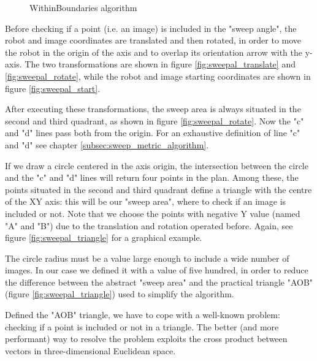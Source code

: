 \begin{figure}[htp]
\begin{center}
    \vspace*{20pt}

  \end{center}
  \caption{WithinBoundaries algorithm}
  \label{fig:withingboundaries}
\end{figure}

%
Before checking if a point (i.e. an image) is included in the "sweep angle", the robot and image coordinates
are translated and then rotated, in order to move the robot in the origin of the axis and to overlap its
orientation arrow with the y-axis. The two transformations are shown in figure \ref{fig:sweepal_translate} and
\ref{fig:sweepal_rotate}, while the robot and image starting coordinates are shown in figure \ref{fig:sweepal_start}.
%

%
After executing these transformations, the sweep area is always situated in the second and third quadrant, as
shown in figure \ref{fig:sweepal_rotate}. Now the "c" and "d" lines pass both from the origin. For an exhaustive
definition of line "c" and "d" see chapter \ref{subsec:sweep_metric_algorithm}.
%

%
If we draw a circle centered in the axis origin, the intersection between the circle and the "c" and "d" lines will
return four points in the plan. Among these, the points situated in the second and third quadrant define a triangle
with the centre of the XY axis: this will be our "sweep area", where to check if an image is included or not. Note
that we choose the points with negative Y value (named "A" and "B") due to the translation and rotation operated
before. Again, see figure \ref{fig:sweepal_triangle} for a graphical example.
%

%
The circle radius must be a value large enough to include a wide number of images. In our case we defined it with a
value of five hundred, in order to reduce the difference between the abstract "sweep area" and the practical triangle
"AOB" (figure \ref{fig:sweepal_triangle}) used to simplify the algorithm.
%

%
Defined the "AOB" triangle, we have to cope with a well-known problem: checking if a point is included or not in a
triangle. The better (and more performant) way to resolve the problem exploits the cross product between vectors
in three-dimensional Euclidean space.
%

